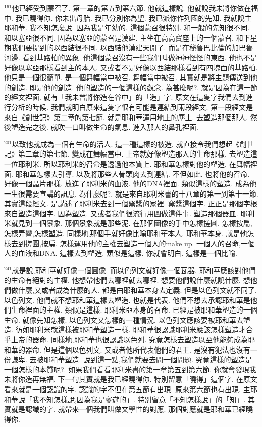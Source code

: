 \documentclass{book}
\begin{document}
$^{161}$他已經受到蒙召了.
第一章的第五到第六節.
他就這樣說.
他就說我未將你做在福中.
我已曉得你.
你未出母胎.
我已分別你為聖.
我已派你作列國的先知.
我就說主耶和華.
我不知怎麼說.
因為我是年幼的.
這個蒙召很特別.
和一般的先知很不同.
和以塞亞很不同.
因為以塞亞的蒙召是漢建.
主坐在高高寶座上的一個蒙召.
和下星期我們要提到的以西結很不同.
以西結他漢建天開了.
而是在秘魯巴比倫的加巴魯河邊.
看到基路柏的異象.
他這個蒙召沒有一些我們叫做神神怪怪的東西.
他也不是好像以塞亞那樣看到主的本人.
又或者不是好像以西結那樣看到有四塊面的基路柏.
他只是一個很簡單.
是一個舞幅當中被召.
舞幅當中被召.
其實就是將主題傳送到他的創造.
即是他的創造.
他的塑造的一個這樣的觀念.
為甚麼呢?.
就是因為在這一節的經文裡面.
就有「我未曾將你造在谷中」的「造」字.
原文在這隻字我們去到進行分析的時候.
我們就明白原來這隻字很有可能是連結到兩段經文.
第一段經文是來自《創世記》第二章的第七節.
就是耶和華運用地上的塵土.
去塑造那個那人.
然後塑造完之後.
就吹一口叫做生命的氣息.
進入那人的鼻孔裡面.

$^{201}$以致他就成為一個有生命的活人.
這一種這樣的被造.
就直接令我們想起《創世記》第二章的第七節.
變成在舞幅當中.
上帝就好像塑造那人的生命那樣.
去塑造這一位耶利米.
所以耶利米的召命是透過他本質上.
耶和華怎樣對他的塑造.
在舞幅裡面.
耶和華怎樣去引導.
以及將那些人骨頭肉去到連結.
不但如此.
也將他的召命.
好像一個晶片那樣.
放進了耶利米的血液.
他的DNA裡面.
類似這樣的塑造.
成為他一生很需要宣講的訊息.
為什麼呢?.
就是來自耶利米書的十八章的第一到第十一節.
其實這段經文.
是講述了耶利米去到一個窯醬的家裡.
窯醬這個字.
正正是那個字根來自塑造這個字.
因為塑造.
又或者我們很流行用圖做這件事.
塑造那個器皿.
耶利米就見到一個景象.
那個景象就是那些泥.
在那個圖像的手中怎樣搓圓.
怎樣按扁,怎樣弄彎,怎樣塑造.
同樣地,那個手就好像比喻耶和華本人.
耶和華本身.
就是他怎樣去到搓圓,按扁.
怎樣運用他的主權去塑造一個人的make up.
一個人的召命,一個人的血液和DNA.
這樣去到塑造.
類似是這樣.
你就會明白.
這樣是一個比喻.

$^{241}$就是說,耶和華就好像一個圖像.
而以色列文就好像一個瓦器.
耶和華應該對他們的生命有絕對的主權.
他想帶他們去哪裡就去哪裡.
想要他們說什麼就說什麼.
想他們做什麼,又或者成為什麼的人.
都是由耶和華本身去定義.
但是以色列文就不同了.
以色列文.
他們就不想耶和華這樣去塑造.
也就是代表.
他們不想去承認耶和華是他們生命裡面的主權.
類似是這樣.
耶利米亞本身的召命.
已經是被耶和華塑造的一個生命.
就像先知怎樣.
以色列文又怎樣的一種情況.
以色列文應該要被耶和華去塑造.
彷如耶利米就這樣被耶和華塑造一樣.
耶和華很認識耶利米應該怎樣塑造才合乎上帝的器命.
同樣地,耶和華也很認識以色列.
究竟怎樣去塑造以至他能夠成為耶和華的器命.
但是這個以色列文.
又或者他所代表他們的君王.
是沒有犯法也沒有一份謙卑.
去被耶和華塑造.
說到這一點,我們就要去問一個問題.
究竟這樣的塑造是一個怎樣的本質呢?.
如果我們看看耶利米書的第一章第五到第六節.
你就會發現我未將你造再無福.
下一句其實就是我已經曉得你.
特別留意「曉得」這個字.
在原文看來就是一個認識的字.
認識的字不但在第五節有出現.
原來第六節也有出現.
主耶和華說「我不知怎樣說,因為我是寥遊的」.
特別留意「不知怎樣說」的「知」.
其實就是認識的字.
就帶來一個我們叫做文學性的對應.
那個對應就是耶和華已經曉得你.
\end{document}

